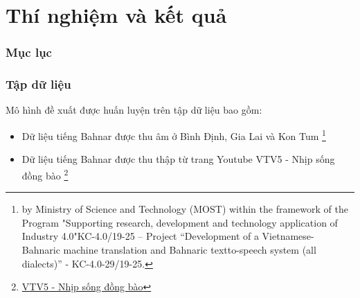 \documentclass{beamer}
\numberwithin{figure}{section}
\numberwithin{table}{section}
\begin{document}


\section{Thí nghiệm và kết quả}
{
    \begin{frame}
        \frametitle{Mục lục}
        \tableofcontents[currentsection]
    \end{frame}
}%
\begin{frame}
\frametitle{Tập dữ liệu}
Mô hình đề xuất được huấn luyện trên tập dữ liệu bao gồm:
\begin{itemize}
    \item Dữ liệu tiếng Bahnar được thu âm ở Bình Định, Gia Lai và Kon Tum \footnote{by Ministry of Science and Technology (MOST) within the framework of the Program "Supporting research, development and technology application of Industry 4.0"KC-4.0/19-25 – Project “Development of a Vietnamese- Bahnaric machine translation and Bahnaric textto-speech system (all dialects)” - KC-4.0-29/19-25.}
    \item Dữ liệu tiếng Bahnar được thu thập từ trang Youtube VTV5 - Nhịp sống đồng bào \footnote{\href{https://www.youtube.com/@vtv5nhipsong}{VTV5 - Nhịp sống đồng bào}}
\end{itemize}
\end{frame}
\end{document}
